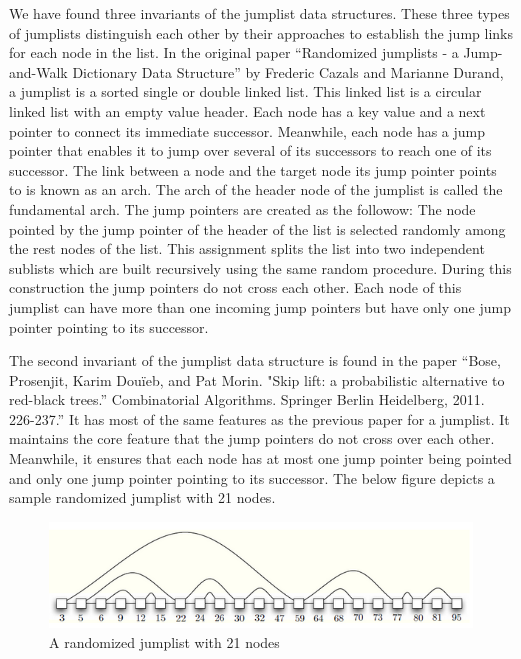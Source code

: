 \documentclass[oribibl]{llncs}
\begin{document}
We have found three invariants of the jumplist data structures. These three types of jumplists distinguish each other by their approaches to establish the jump links for each node in the list. In the original paper “Randomized jumplists - a Jump-and-Walk Dictionary Data Structure” by Frederic Cazals and Marianne Durand, a jumplist is a sorted single or double linked list. This linked list is a circular linked list with an empty value header. Each node has a key value and a next pointer to connect its immediate successor. Meanwhile, each node has a jump pointer that enables it to jump over several of its successors to reach one of its successor. The link between a node and the target node its jump pointer points to is known as an arch. The arch of the header node of the jumplist is called the fundamental arch. The jump pointers are created as the followow: The node pointed by the jump pointer of the header of the list is selected randomly among the rest nodes of the list. This assignment splits the list into two independent sublists which are built recursively using the same random procedure. During this construction the jump pointers do not cross each other. Each node of this jumplist can have more than one incoming jump pointers but have only one jump pointer pointing to its successor.

The second invariant of the jumplist data structure is found in the paper “Bose, Prosenjit, Karim Douïeb, and Pat Morin. "Skip lift: a probabilistic alternative to red-black trees.” Combinatorial Algorithms. Springer Berlin Heidelberg, 2011. 226-237.” It has most of the same features as the previous paper for a jumplist. It maintains the core feature that the jump pointers do not cross over each other. Meanwhile, it ensures that each node has at most one jump pointer being pointed and only one jump pointer pointing to its successor. The below figure depicts a sample randomized jumplist with 21 nodes.


\begin{figure}[here]
\center
\includegraphics[width=15cm]{images/jumplist}
\caption{A randomized jumplist with 21 nodes}
\label{fig:jumplist}
\end{figure}
\end{document}

